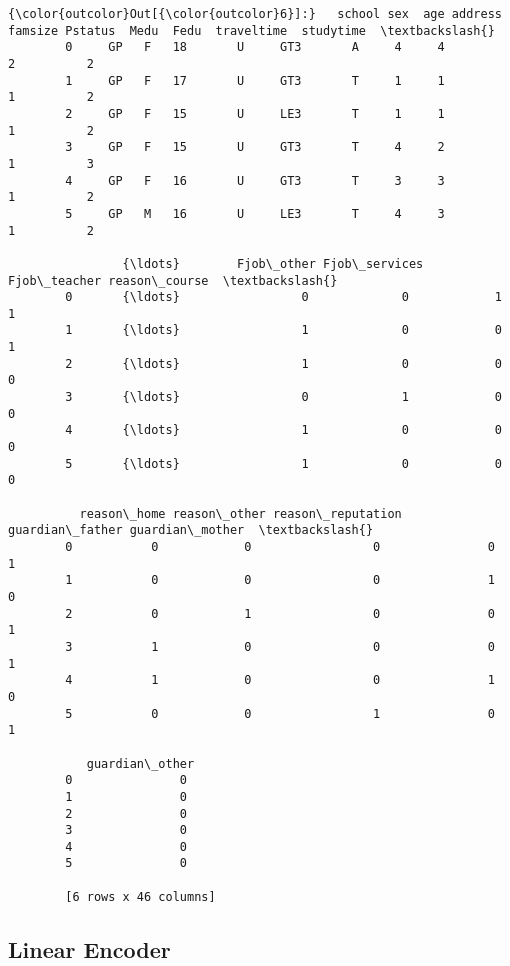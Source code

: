 \documentclass[11pt]{article}
\begin{document}
\begin{Verbatim}[commandchars=\\\{\}]
{\color{outcolor}Out[{\color{outcolor}6}]:}   school sex  age address famsize Pstatus  Medu  Fedu  traveltime  studytime  \textbackslash{}
        0     GP   F   18       U     GT3       A     4     4           2          2   
        1     GP   F   17       U     GT3       T     1     1           1          2   
        2     GP   F   15       U     LE3       T     1     1           1          2   
        3     GP   F   15       U     GT3       T     4     2           1          3   
        4     GP   F   16       U     GT3       T     3     3           1          2   
        5     GP   M   16       U     LE3       T     4     3           1          2   
        
                {\ldots}        Fjob\_other Fjob\_services Fjob\_teacher reason\_course  \textbackslash{}
        0       {\ldots}                 0             0            1             1   
        1       {\ldots}                 1             0            0             1   
        2       {\ldots}                 1             0            0             0   
        3       {\ldots}                 0             1            0             0   
        4       {\ldots}                 1             0            0             0   
        5       {\ldots}                 1             0            0             0   
        
          reason\_home reason\_other reason\_reputation guardian\_father guardian\_mother  \textbackslash{}
        0           0            0                 0               0               1   
        1           0            0                 0               1               0   
        2           0            1                 0               0               1   
        3           1            0                 0               0               1   
        4           1            0                 0               1               0   
        5           0            0                 1               0               1   
        
           guardian\_other  
        0               0  
        1               0  
        2               0  
        3               0  
        4               0  
        5               0  
        
        [6 rows x 46 columns]
\end{Verbatim}
            
    \hypertarget{linear-encoder}{%
\subsection{Linear Encoder}\label{linear-encoder}}
\end{document}
